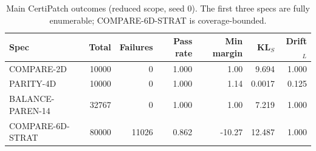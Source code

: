 \begin{table}[t]
\centering
\small
\setlength{\tabcolsep}{4pt}
\begin{tabular}{lrrrrrr}
\toprule
Spec & Total & Failures & Pass rate & Min margin & KL$_S$ & Drift$_L$ \\
\midrule
COMPARE-2D & 10000 & 0 & 1.000 & 1.00 & 9.694 & 1.000 \\
PARITY-4D & 10000 & 0 & 1.000 & 1.14 & 0.0017 & 0.125 \\
BALANCE-PAREN-14 & 32767 & 0 & 1.000 & 1.00 & 7.219 & 1.000 \\
COMPARE-6D-STRAT & 80000 & 11026 & 0.862 & -10.27 & 12.487 & 1.000 \\
\bottomrule
\end{tabular}
\caption{Main CertiPatch outcomes (reduced scope, seed 0). The first three specs are fully enumerable; COMPARE-6D-STRAT is coverage-bounded.}
\label{tab:main_runs}
\end{table}
